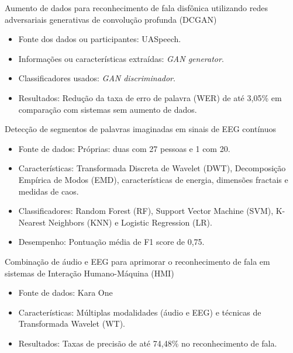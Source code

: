 \documentclass{beamer}
\begin{document}
	
	\begin{frame}{Aumento de dados para reconhecimento de fala disfônica utilizando redes adversariais generativas de convolução profunda (DCGAN) \cite{jin21_interspeech}}
		\begin{itemize}
			\item Fonte dos dados ou participantes: UASpeech.
			\item Informações ou características extraídas: \textit{GAN generator}.
			\item Classificadores usados: \textit{GAN discriminador}.
			\item Resultados: Redução da taxa de erro de palavra (WER) de até 3,05\% em comparação com sistemas sem aumento de dados.
		\end{itemize}
		
	\end{frame}


	\begin{frame}{Detecção de segmentos de palavras imaginadas em sinais de EEG contínuos \cite{WOS:000614122200021}}
		\begin{itemize}
			\item Fonte de dados: Próprias: duas com 27 pessoas e 1 com 20.
			\item Características: Transformada Discreta de Wavelet (DWT), Decomposição Empírica de Modos (EMD), características de energia, dimensões fractais e medidas de caos.
			\item Classificadores: Random Forest (RF), Support Vector Machine (SVM), K-Nearest Neighbors (KNN) e Logistic Regression (LR).
			\item Desempenho: Pontuação média de F1 score de 0,75.
		\end{itemize}
		
	\end{frame}

	\begin{frame}{Combinação de áudio e EEG para aprimorar o reconhecimento de fala em sistemas de Interação Humano-Máquina (HMI) \cite{WOS:000591530700001}}
		\begin{itemize}
			\item Fonte de dados: Kara One \cite{zhao2015classifying}
			\item Características: Múltiplas modalidades (áudio e EEG) e técnicas de Transformada Wavelet (WT).
			\item Resultados: Taxas de precisão de até 74,48\% no reconhecimento de fala.
		\end{itemize}
		
	\end{frame}
		
\end{document}
